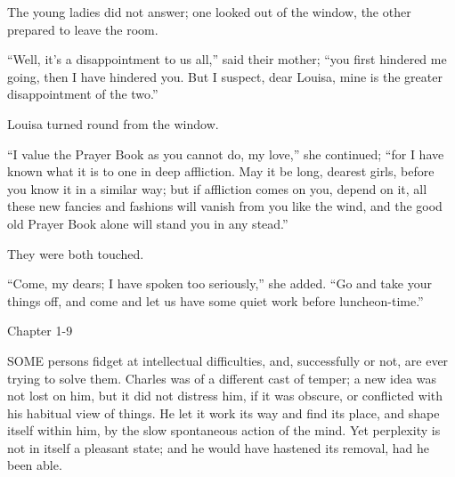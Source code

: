 The young ladies did not answer; one looked out of the window, the
other prepared to leave the room.

``Well, it's a disappointment to us all,'' said their
mother; ``you first hindered me going, then I have hindered you.
But I suspect, dear Louisa, mine is the greater disappointment of the
two.''

Louisa turned round from the window.

``I value the Prayer Book as you cannot do, my love,'' she
continued; ``for I have known what it is to one in deep
affliction. May it be long, dearest girls, before you know it in a
similar way; but if affliction comes on you, depend on it, all these
new fancies and fashions will vanish from you like the wind, and the
good old Prayer Book alone will stand you in any stead.''

They were both touched.

``Come, my dears; I have spoken too seriously,'' she added.
``Go and take your things off, and come and let us have some quiet
work before luncheon-time.''

Chapter 1-9


SOME persons fidget at intellectual
difficulties, and, successfully or not, are ever trying to solve them.
Charles was of a different cast of temper; a new idea was not lost on
him, but it did not distress him, if it was obscure, or conflicted
with his habitual view of things. He let it work its way and find its
place, and shape itself within him, by the slow spontaneous action of
the mind. Yet perplexity is not in itself a pleasant state; and he
would have hastened its removal, had he been able.

